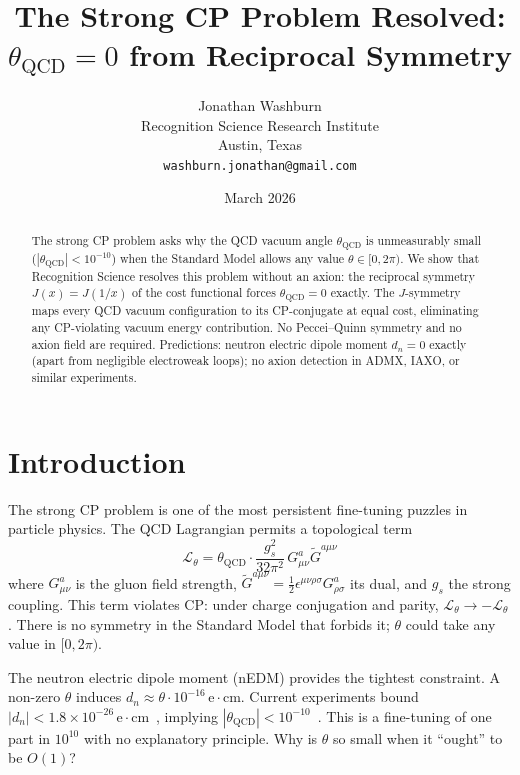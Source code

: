 \documentclass[12pt,a4paper]{article}
\title{The Strong CP Problem Resolved:\\
$\theta_{\mathrm{QCD}} = 0$ from Reciprocal Symmetry}
\author{Jonathan Washburn\\
Recognition Science Research Institute\\
Austin, Texas\\
\texttt{washburn.jonathan@gmail.com}}
\date{March 2026}
\theoremstyle{definition}
\theoremstyle{remark}
\begin{document}
\maketitle

\begin{abstract}
The strong CP problem asks why the QCD vacuum angle
$\theta_{\mathrm{QCD}}$ is unmeasurably small
($|\theta_{\mathrm{QCD}}| < 10^{-10}$) when the Standard Model
allows any value $\theta \in [0, 2\pi)$.  We show that Recognition
Science resolves this problem without an axion: the reciprocal
symmetry $J(x) = J(1/x)$ of the cost functional forces
$\theta_{\mathrm{QCD}} = 0$ exactly.  The $J$-symmetry maps every
QCD vacuum configuration to its CP-conjugate at equal cost,
eliminating any CP-violating vacuum energy contribution.  No Peccei--Quinn
symmetry and no axion field are required.  Predictions: neutron
electric dipole moment $d_n = 0$ exactly (apart from negligible
electroweak loops); no axion detection in ADMX, IAXO, or similar
experiments.
\end{abstract}

\section{Introduction}
\label{sec:intro}

The strong CP problem is one of the most persistent fine-tuning
puzzles in particle physics.  The QCD Lagrangian permits a
topological term
\begin{equation}
\mathcal{L}_\theta = \theta_{\mathrm{QCD}} \cdot \frac{g_s^2}{32\pi^2}
\, G^a_{\mu\nu} \tilde{G}^{a\mu\nu}
\end{equation}
where $G^a_{\mu\nu}$ is the gluon field strength, $\tilde{G}^{a\mu\nu}
= \frac{1}{2}\epsilon^{\mu\nu\rho\sigma} G^a_{\rho\sigma}$ its dual,
and $g_s$ the strong coupling.  This term violates CP: under charge
conjugation and parity, $\mathcal{L}_\theta \to -\mathcal{L}_\theta$.
There is no symmetry in the Standard Model that forbids it; $\theta$
could take any value in $[0, 2\pi)$.

The neutron electric dipole moment (nEDM) provides the tightest
constraint.  A non-zero $\theta$ induces
$d_n \approx \theta \cdot 10^{-16}\,\mathrm{e}\cdot\mathrm{cm}$.
Current experiments bound $|d_n| < 1.8 \times 10^{-26}\,\mathrm{e}
\cdot\mathrm{cm}$~\cite{Abel2020}, implying
$|\theta_{\mathrm{QCD}}| < 10^{-10}$~\cite{PDG2024}.
This is a fine-tuning of one part in $10^{10}$ with no explanatory
principle.  Why is $\theta$ so small when it ``ought'' to be $O(1)$?
\end{document}
